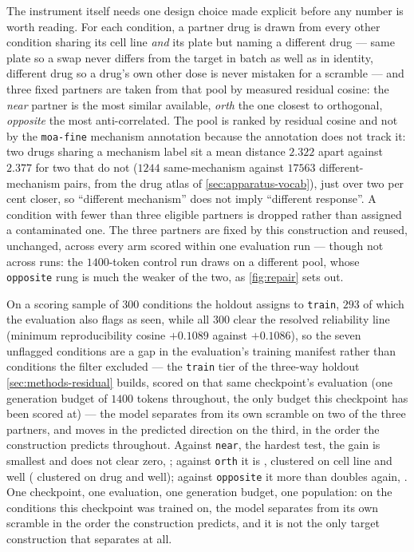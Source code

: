 The instrument itself needs one design choice made explicit before any number is
worth reading. For each condition, a partner drug is drawn from every other
condition sharing its cell line \emph{and} its plate but naming a different drug
--- same plate so a swap never differs from the target in batch as well as in
identity, different drug so a drug's own other dose is never mistaken for a
scramble --- and three fixed partners are taken from that pool by measured
residual cosine: the \emph{near} partner is the most similar available,
\emph{orth} the one closest to orthogonal, \emph{opposite} the most
anti-correlated. The pool is ranked by residual cosine and not by the
\texttt{moa-fine} mechanism annotation because the annotation does not track it:
two drugs sharing a mechanism label sit a mean distance $2.322$ apart against
$2.377$ for two that do not ($\num{1244}$ same-mechanism against $\num{17563}$
different-mechanism pairs, from the drug atlas of \cref{sec:apparatus-vocab}), just over two per cent closer,
so ``different mechanism'' does not imply ``different response''. A condition
with fewer than three eligible partners is dropped rather than assigned a
contaminated one. The three partners are fixed by this construction and reused, unchanged, across
every arm scored within one evaluation run --- though not across runs: the
$1400$-token control run draws on a different pool, whose \texttt{opposite} rung
is much the weaker of the two, as \cref{fig:repair} sets out.

On a scoring sample of $\num{300}$ conditions the holdout assigns to
\texttt{train}, $\num{293}$ of which the evaluation also flags as seen, while all $\num{300}$ clear the resolved reliability line (minimum reproducibility cosine $+0.1089$ against $+0.1086$), so the seven unflagged conditions are a gap in the evaluation's training manifest rather than conditions the filter excluded --- the
\texttt{train} tier of the three-way holdout \cref{sec:methods-residual} builds,
scored on that same checkpoint's evaluation (one
generation budget of $1400$ tokens throughout, the only budget this checkpoint
has been scored at) --- the model separates from its own scramble on two of the
three partners, and moves in the predicted direction on the third, in the order
the construction predicts throughout. Against \texttt{near}, the hardest test,
the gain is smallest and does not clear zero,
; against \texttt{orth} it is
, clustered on cell line and well
( clustered on drug and well); against
\texttt{opposite} it more than doubles again,
. One checkpoint, one evaluation, one generation budget, one
population: on the conditions this checkpoint was trained on, the model separates
from its own scramble in the order the construction predicts, and it is not the
only target construction that separates at all.

